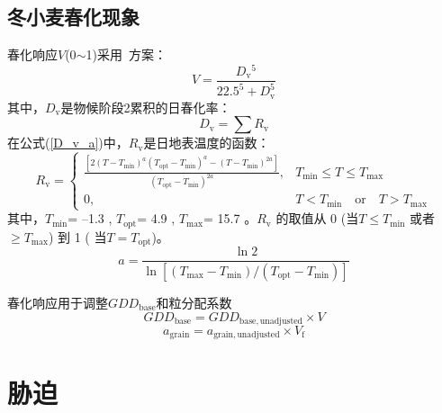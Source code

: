 \subsection{冬小麦春化现象}
春化响应$V$(0$\sim$1)采用~\citet{streck2003incorporating}方案：
\begin{equation}
  V=\frac{D_{\mathrm{v}}{ }^{5}}{22.5^{5}+D_{\mathrm{v}}^{5}}
\end{equation}
其中，$D_{\mathrm {v}} $是物候阶段2累积的日春化率：
\begin{equation}\label{D_v_a}
  D_{\mathrm{v}}=\sum R_{\mathrm{v}}
\end{equation}
在公式(\ref{D_v_a})中，$R_{\mathrm{v}}$是日地表温度的函数：
\begin{equation}
  R_{\mathrm{v}} = \begin{cases}
    \frac{\left[2\left(T-T_{\mathrm{min}}\right)^{a}\left(T_{\mathrm{opt}}-T_{\mathrm{min}}\right)^{a} - \left(T-T_{\mathrm{min}}\right)^{2a}\right]}{\left(T_{\mathrm{opt}}-T_{\mathrm{min}}\right)^{2a}}, &T_{\mathrm{min}} \leqslant T \leqslant T_{\mathrm{max}} \\
    0,  &T<T_{\mathrm{min}} \quad  \text{or} \quad T>T_{\mathrm{max}}
  \end{cases}
\end{equation}
其中，$T_{\mathrm{min}}$= –1.3 \textcelsius, $T_{\mathrm{opt}}$= 4.9 \textcelsius, $T_{\mathrm{max}}$= 15.7 \textcelsius。$ R_{\mathrm {v}} $ 的取值从 0 (当$ T\leqslant T_{\mathrm{min}}$ 或者 $ \geqslant  T_{\mathrm{max}}$) 到 1 ( 当$T=T_{\mathrm{opt}}$)。
\begin{equation}
  a=\frac{\ln 2}{\ln \left[\left(T_{\max }-T_{\min }\right) /\left(T_{\mathrm{o p t}}-T_{\min }\right)\right]}
\end{equation}

春化响应用于调整$GDD_{\mathrm{base}}$和粒分配系数
\begin{equation}
  G D D_{\mathrm{b a s e}}=G D D_{\mathrm{b a s e,  { unadjusted }}} \times V
\end{equation}
\begin{equation}
  a_{\mathrm{ {grain }}}=a_{\mathrm{ {grain,unadjusted }}} \times V_{\mathrm{f}}
\end{equation}


\section{胁迫}
